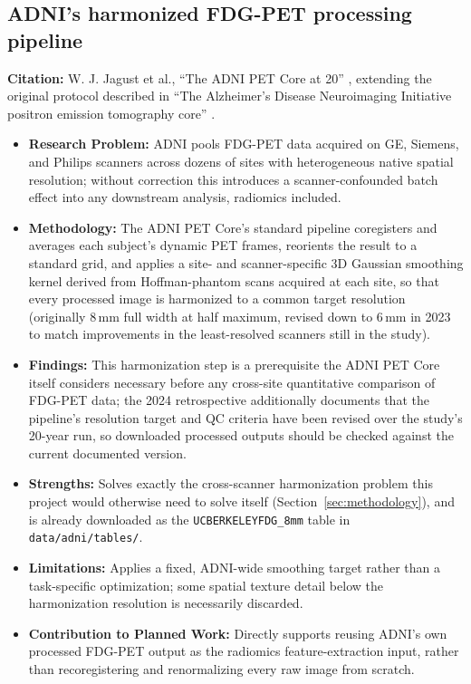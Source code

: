 \subsection{ADNI's harmonized FDG-PET processing pipeline}
\textbf{Citation:} W. J. Jagust et al., ``The ADNI PET Core at 20'' \cite{jagust2024petcore}, extending the original protocol described in ``The Alzheimer's Disease Neuroimaging Initiative positron emission tomography core'' \cite{jagust2010petcore}.

\begin{itemize}
    \item \textbf{Research Problem:} ADNI pools FDG-PET data acquired on GE, Siemens, and Philips scanners across dozens of sites with heterogeneous native spatial resolution; without correction this introduces a scanner-confounded batch effect into any downstream analysis, radiomics included.
    \item \textbf{Methodology:} The ADNI PET Core's standard pipeline coregisters and averages each subject's dynamic PET frames, reorients the result to a standard grid, and applies a site- and scanner-specific 3D Gaussian smoothing kernel derived from Hoffman-phantom scans acquired at each site, so that every processed image is harmonized to a common target resolution (originally 8\,mm full width at half maximum, revised down to 6\,mm in 2023 to match improvements in the least-resolved scanners still in the study).
    \item \textbf{Findings:} This harmonization step is a prerequisite the ADNI PET Core itself considers necessary before any cross-site quantitative comparison of FDG-PET data; the 2024 retrospective additionally documents that the pipeline's resolution target and QC criteria have been revised over the study's 20-year run, so downloaded processed outputs should be checked against the current documented version.
    \item \textbf{Strengths:} Solves exactly the cross-scanner harmonization problem this project would otherwise need to solve itself (Section~\ref{sec:methodology}), and is already downloaded as the \texttt{UCBERKELEYFDG\_8mm} table in \texttt{data/adni/tables/}.
    \item \textbf{Limitations:} Applies a fixed, ADNI-wide smoothing target rather than a task-specific optimization; some spatial texture detail below the harmonization resolution is necessarily discarded.
    \item \textbf{Contribution to Planned Work:} Directly supports reusing ADNI's own processed FDG-PET output as the radiomics feature-extraction input, rather than recoregistering and renormalizing every raw image from scratch.
\end{itemize}

